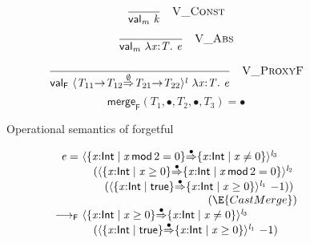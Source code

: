 \documentclass[9pt]{extarticle}
\newcommand{\ottdrule}[4][]{{\displaystyle\frac{\begin{array}{l}#2\end{array}}{#3}\quad\ottdrulename{#4}}}
\newcommand{\ottusedrule}[1]{\[#1\]}
\newcommand{\ottnt}[1]{\mathit{#1}}
\newcommand{\ottsym}[1]{#1}
\newcommand{\ottdrulename}[1]{\textsc{#1}}
\newcommand{\ottdruleVXXConst}[1]{\ottdrule[#1]{}{
 \mathsf{val} _{ \ottnt{m} }~ \ottnt{k} }{{\ottdrulename{V\_Const}}{}}}
\newcommand{\ottdruleVXXAbs}[1]{\ottdrule[#1]{}{
 \mathsf{val} _{ \ottnt{m} }~  \lambda \mathit{x} \mathord{:} \ottnt{T} .~  \ottnt{e}  }{{\ottdrulename{V\_Abs}}{}}}
\newcommand{\ottdruleVXXProxyF}[1]{\ottdrule[#1]{}{
 \mathsf{val} _{  \mathsf{F}  }~  \langle   \ottnt{T_{{\mathrm{11}}}} \mathord{ \rightarrow } \ottnt{T_{{\mathrm{12}}}}   \mathord{ \overset{ \emptyset }{\Rightarrow} }   \ottnt{T_{{\mathrm{21}}}} \mathord{ \rightarrow } \ottnt{T_{{\mathrm{22}}}}   \rangle^{ \ottnt{l} } ~   \lambda \mathit{x} \mathord{:} \ottnt{T} .~  \ottnt{e}   }{{\ottdrulename{V\_ProxyF}}{}}}
\begin{document}
{\begin{figure}[t]
  {\iffull
    {\ottusedrule{\ottdruleVXXConst{}}}
    {\ottusedrule{\ottdruleVXXAbs{}}}
  \fi}

  {\ottusedrule{\ottdruleVXXProxyF{}}}
  {\[  \mathsf{merge} _{  \mathsf{F}  }( \ottnt{T_{{\mathrm{1}}}} , \bullet , \ottnt{T_{{\mathrm{2}}}} , \bullet , \ottnt{T_{{\mathrm{3}}}} )   \ottsym{=}  \bullet \]}
  \vspace*{-10pt}
  \caption{Operational semantics of forgetful \lambdah}
  \label{fig:forgetfulopsem}
\end{figure}

\begin{figure}
\[ \begin{array}{r@{~}l}
  \ottnt{e} = &  \langle   \{ \mathit{x} \mathord{:}  \mathsf{Int}  \mathrel{\mid}  \mathit{x} \,  \mathsf{mod}  \, \ottsym{2}  \mathrel{=}  \ottsym{0}  \}   \mathord{ \overset{\bullet}{\Rightarrow} }   \{ \mathit{x} \mathord{:}  \mathsf{Int}  \mathrel{\mid}  \mathit{x}  \mathrel{\ne}  \ottsym{0}  \}   \rangle^{ \ottnt{l_{{\mathrm{3}}}} } ~  {} \\  &  \quad   (  \langle   \{ \mathit{x} \mathord{:}  \mathsf{Int}  \mathrel{\mid}  \mathit{x}  \mathrel{\ge}  \ottsym{0}  \}   \mathord{ \overset{\bullet}{\Rightarrow} }   \{ \mathit{x} \mathord{:}  \mathsf{Int}  \mathrel{\mid}  \mathit{x} \,  \mathsf{mod}  \, \ottsym{2}  \mathrel{=}  \ottsym{0}  \}   \rangle^{ \ottnt{l_{{\mathrm{2}}}} } ~  {} \\  &  \qquad   (  \langle   \{ \mathit{x} \mathord{:}  \mathsf{Int}  \mathrel{\mid}  \mathsf{true}  \}   \mathord{ \overset{\bullet}{\Rightarrow} }   \{ \mathit{x} \mathord{:}  \mathsf{Int}  \mathrel{\mid}  \mathit{x}  \mathrel{\ge}  \ottsym{0}  \}   \rangle^{ \ottnt{l_{{\mathrm{1}}}} } ~   {-1}   )   )   \\
 \multicolumn{2}{r}{(\E{CastMerge})} \\
  \longrightarrow _{  \mathsf{F}  }  &  \langle   \{ \mathit{x} \mathord{:}  \mathsf{Int}  \mathrel{\mid}  \mathit{x}  \mathrel{\ge}  \ottsym{0}  \}   \mathord{ \overset{\bullet}{\Rightarrow} }   \{ \mathit{x} \mathord{:}  \mathsf{Int}  \mathrel{\mid}  \mathit{x}  \mathrel{\ne}  \ottsym{0}  \}   \rangle^{ \ottnt{l_{{\mathrm{3}}}} } ~  {} \\  &  \quad   (  \langle   \{ \mathit{x} \mathord{:}  \mathsf{Int}  \mathrel{\mid}  \mathsf{true}  \}   \mathord{ \overset{\bullet}{\Rightarrow} }   \{ \mathit{x} \mathord{:}  \mathsf{Int}  \mathrel{\mid}  \mathit{x}  \mathrel{\ge}  \ottsym{0}  \}   \rangle^{ \ottnt{l_{{\mathrm{1}}}} } ~   {-1}   )   \\

\end{array}\]
\end{figure}}
\end{document}

